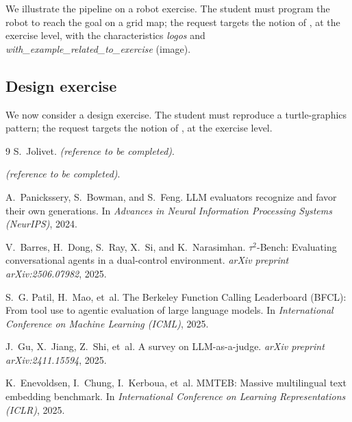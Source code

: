 \documentclass[10pt]{article}
\newcommand{\charac}[1]{\textit{#1}}
\begin{document}
We illustrate the pipeline on a robot exercise. The student must program the robot to reach the goal on a grid map; the request targets the notion of %
, at the exercise level, with the characteristics \charac{logos} and \charac{with\_example\_related\_to\_exercise} (image).

\subsection{Design exercise}
\label{sec:example-design}

We now consider a design exercise. The student must reproduce a turtle-graphics pattern; the request targets the notion of %
, at the exercise level.

\begin{thebibliography}{9}
S.~Jolivet. \emph{(reference to be completed)}.

\emph{(reference to be completed)}.

A.~Panickssery, S.~Bowman, and S.~Feng.
LLM evaluators recognize and favor their own generations.
In \emph{Advances in Neural Information Processing Systems (NeurIPS)}, 2024.

V.~Barres, H.~Dong, S.~Ray, X.~Si, and K.~Narasimhan.
$\tau^2$-Bench: Evaluating conversational agents in a dual-control environment.
\emph{arXiv preprint arXiv:2506.07982}, 2025.

S.~G. Patil, H.~Mao, et~al.
The Berkeley Function Calling Leaderboard (BFCL): From tool use to agentic evaluation of large language models.
In \emph{International Conference on Machine Learning (ICML)}, 2025.

J.~Gu, X.~Jiang, Z.~Shi, et~al.
A survey on LLM-as-a-judge.
\emph{arXiv preprint arXiv:2411.15594}, 2025.

K.~Enevoldsen, I.~Chung, I.~Kerboua, et~al.
MMTEB: Massive multilingual text embedding benchmark.
In \emph{International Conference on Learning Representations (ICLR)}, 2025.
\end{thebibliography}
\end{document}
